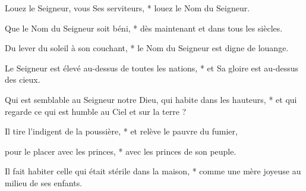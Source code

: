 \item Louez le Seigneur, vous Ses serviteurs, * louez le Nom du Seigneur.
\item {} Que le Nom du Seigneur soit béni, * dès maintenant et dans tous les siècles.
\item Du lever du soleil à son couchant, * le Nom du Seigneur est digne de louange.
\item Le Seigneur est élevé au-dessus de toutes les nations, * et Sa gloire est au-dessus des cieux.
\item Qui est semblable au Seigneur notre Dieu, qui habite dans les hauteurs, * et qui regarde ce qui est humble au Ciel et sur la terre ?
\item Il tire l'indigent de la poussière, * et relève le pauvre du fumier,
\item pour le placer avec les princes, * avec les princes de son peuple.
\item Il fait habiter celle qui était stérile dans la maison, * comme une mère joyeuse au milieu de ses enfants.
